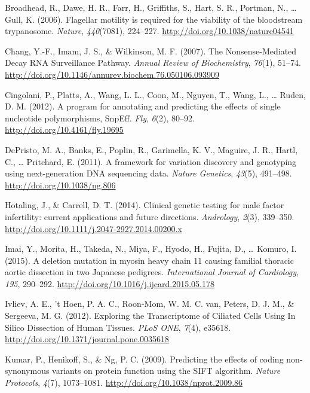 \documentclass[12pt,twoside]{reedthesis}
\theoremstyle{definition}
\theoremstyle{definition}
\theoremstyle{remark}
\begin{document}
  \hypertarget{ref-Broadhead2006}{}
  Broadhead, R., Dawe, H. R., Farr, H., Griffiths, S., Hart, S. R.,
  Portman, N., \ldots{} Gull, K. (2006). Flagellar motility is required
  for the viability of the bloodstream trypanosome. \emph{Nature},
  \emph{440}(7081), 224--227. \url{http://doi.org/10.1038/nature04541}
  
  \hypertarget{ref-Chang2007}{}
  Chang, Y.-F., Imam, J. S., \& Wilkinson, M. F. (2007). The
  Nonsense-Mediated Decay RNA Surveillance Pathway. \emph{Annual Review of
  Biochemistry}, \emph{76}(1), 51--74.
  \url{http://doi.org/10.1146/annurev.biochem.76.050106.093909}
  
  \hypertarget{ref-Cingolani2012}{}
  Cingolani, P., Platts, A., Wang, L. L., Coon, M., Nguyen, T., Wang, L.,
  \ldots{} Ruden, D. M. (2012). A program for annotating and predicting
  the effects of single nucleotide polymorphisms, SnpEff. \emph{Fly},
  \emph{6}(2), 80--92. \url{http://doi.org/10.4161/fly.19695}
  
  \hypertarget{ref-DePristo2011}{}
  DePristo, M. A., Banks, E., Poplin, R., Garimella, K. V., Maguire, J.
  R., Hartl, C., \ldots{} Pritchard, E. (2011). A framework for variation
  discovery and genotyping using next-generation DNA sequencing data.
  \emph{Nature Genetics}, \emph{43}(5), 491--498.
  \url{http://doi.org/10.1038/ng.806}
  
  \hypertarget{ref-Hotaling2014}{}
  Hotaling, J., \& Carrell, D. T. (2014). Clinical genetic testing for
  male factor infertility: current applications and future directions.
  \emph{Andrology}, \emph{2}(3), 339--350.
  \url{http://doi.org/10.1111/j.2047-2927.2014.00200.x}
  
  \hypertarget{ref-Imai2015}{}
  Imai, Y., Morita, H., Takeda, N., Miya, F., Hyodo, H., Fujita, D.,
  \ldots{} Komuro, I. (2015). A deletion mutation in myosin heavy chain 11
  causing familial thoracic aortic dissection in two Japanese pedigrees.
  \emph{International Journal of Cardiology}, \emph{195}, 290--292.
  \url{http://doi.org/10.1016/j.ijcard.2015.05.178}
  
  \hypertarget{ref-Ivliev2012}{}
  Ivliev, A. E., 't Hoen, P. A. C., Roon-Mom, W. M. C. van, Peters, D. J.
  M., \& Sergeeva, M. G. (2012). Exploring the Transcriptome of Ciliated
  Cells Using In Silico Dissection of Human Tissues. \emph{PLoS ONE},
  \emph{7}(4), e35618. \url{http://doi.org/10.1371/journal.pone.0035618}
  
  \hypertarget{ref-Kumar2009}{}
  Kumar, P., Henikoff, S., \& Ng, P. C. (2009). Predicting the effects of
  coding non-synonymous variants on protein function using the SIFT
  algorithm. \emph{Nature Protocols}, \emph{4}(7), 1073--1081.
  \url{http://doi.org/10.1038/nprot.2009.86}
  
\end{document}
